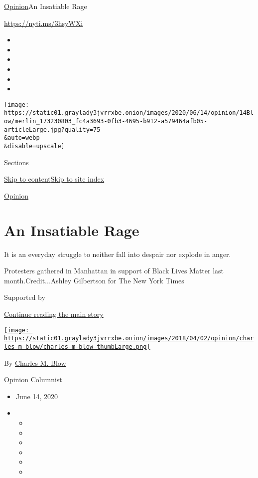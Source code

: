 \href{/section/opinion}{Opinion}\textbar{}An Insatiable Rage

\url{https://nyti.ms/3hsyWXi}

\begin{itemize}
\item
\item
\item
\item
\item
\item
\end{itemize}

\texttt{[image: https://static01.graylady3jvrrxbe.onion/images/2020/06/14/opinion/14Blow/merlin\_173230803\_fc4a3693-0fb3-4695-b912-a579464afb05-articleLarge.jpg?quality=75\\\&auto=webp\\\&disable=upscale]}

Sections

\protect\hyperlink{site-content}{Skip to
content}\protect\hyperlink{site-index}{Skip to site index}

\href{/section/opinion}{Opinion}

\hypertarget{an-insatiable-rage}{%
\section{An Insatiable Rage}\label{an-insatiable-rage}}

It is an everyday struggle to neither fall into despair nor explode in
anger.

Protesters gathered in Manhattan in support of Black Lives Matter last
month.Credit...Ashley Gilbertson for The New York Times

Supported by

\protect\hyperlink{after-sponsor}{Continue reading the main story}

\href{https://www.nytimes3xbfgragh.onion/by/charles-m-blow}{\texttt{[image: https://static01.graylady3jvrrxbe.onion/images/2018/04/02/opinion/charles-m-blow/charles-m-blow-thumbLarge.png]}}

By \href{https://www.nytimes3xbfgragh.onion/by/charles-m-blow}{Charles
M. Blow}

Opinion Columnist

\begin{itemize}
\item
  June 14, 2020
\item
  \begin{itemize}
  \item
  \item
  \item
  \item
  \item
  \item
  \end{itemize}
\end{itemize}

